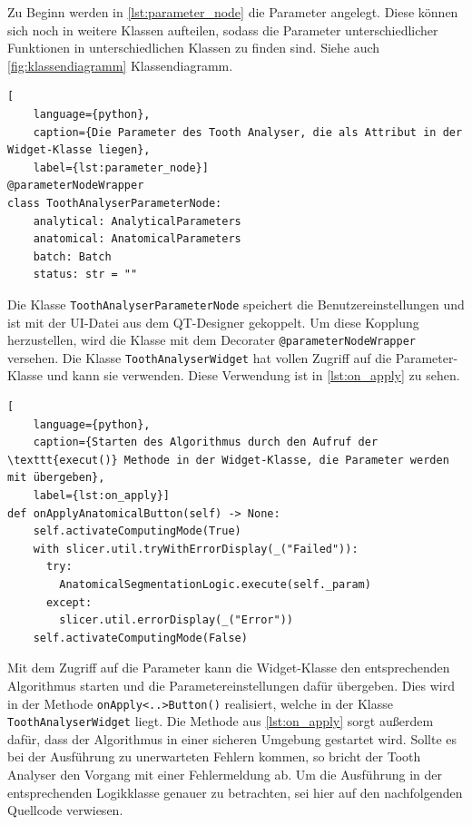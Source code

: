 Zu Beginn werden in \ref{lst:parameter_node} die Parameter angelegt. Diese können
sich noch in weitere Klassen aufteilen, sodass die Parameter unterschiedlicher
Funktionen in unterschiedlichen Klassen zu finden sind. Siehe auch \ref{fig:klassendiagramm}
Klassendiagramm.

\begin{lstlisting}[
    language={python},
    caption={Die Parameter des Tooth Analyser, die als Attribut in der Widget-Klasse liegen},
    label={lst:parameter_node}]
@parameterNodeWrapper
class ToothAnalyserParameterNode:
    analytical: AnalyticalParameters
    anatomical: AnatomicalParameters
    batch: Batch
    status: str = ""
\end{lstlisting}

Die Klasse \texttt{ToothAnalyserParameterNode} speichert die Benutzereinstellungen
und ist mit der \ac{UI}-Datei aus dem QT-Designer gekoppelt. Um diese Kopplung herzustellen,
wird die Klasse mit dem Decorater \texttt{@parameterNodeWrapper} versehen. Die
Klasse \texttt{ToothAnalyserWidget} hat vollen Zugriff auf die Parameter-Klasse und
kann sie verwenden. Diese Verwendung ist in \ref{lst:on_apply} zu sehen.

\begin{lstlisting}[
    language={python},
    caption={Starten des Algorithmus durch den Aufruf der \texttt{execut()} Methode in der Widget-Klasse, die Parameter werden mit übergeben},
    label={lst:on_apply}]
def onApplyAnatomicalButton(self) -> None:
    self.activateComputingMode(True)
    with slicer.util.tryWithErrorDisplay(_("Failed")):
	  try:
	    AnatomicalSegmentationLogic.execute(self._param)
	  except:
	    slicer.util.errorDisplay(_("Error"))
    self.activateComputingMode(False)
\end{lstlisting}

Mit dem Zugriff auf die Parameter kann die Widget-Klasse den entsprechenden Algorithmus
starten und die Parametereinstellungen dafür übergeben. Dies wird in der Methode
\texttt{onApply<..>Button()} realisiert, welche in der Klasse \texttt{ToothAnalyserWidget}
liegt. Die Methode aus \ref{lst:on_apply} sorgt außerdem dafür, dass der Algorithmus
in einer sicheren Umgebung gestartet wird. Sollte es bei der Ausführung zu
unerwarteten Fehlern kommen, so bricht der Tooth Analyser den Vorgang mit einer Fehlermeldung
ab. Um die Ausführung in der entsprechenden Logikklasse genauer zu betrachten, sei
hier auf den nachfolgenden Quellcode verwiesen.

\pagebreak

